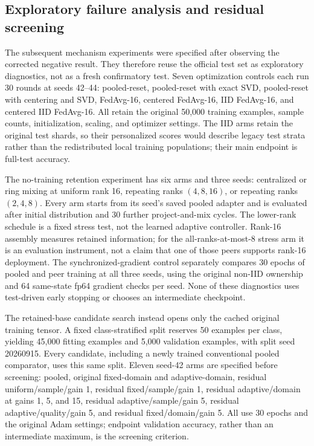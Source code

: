 \documentclass[11pt]{article}
\begin{document}
\subsection{Exploratory failure analysis and residual screening}
The subsequent mechanism experiments were specified after observing the corrected negative result. They therefore reuse the official test set as exploratory diagnostics, not as a fresh confirmatory test. Seven optimization controls each run 30 rounds at seeds 42--44: pooled-reset, pooled-reset with exact SVD, pooled-reset with centering and SVD, FedAvg-16, centered FedAvg-16, IID FedAvg-16, and centered IID FedAvg-16. All retain the original 50,000 training examples, sample counts, initialization, scaling, and optimizer settings. The IID arms retain the original test shards, so their personalized scores would describe legacy test strata rather than the redistributed local training populations; their main endpoint is full-test accuracy.

The no-training retention experiment has six arms and three seeds: centralized or ring mixing at uniform rank 16, repeating ranks $(4,8,16)$, or repeating ranks $(2,4,8)$. Every arm starts from its seed's saved pooled adapter and is evaluated after initial distribution and 30 further project-and-mix cycles. The lower-rank schedule is a fixed stress test, not the learned adaptive controller. Rank-16 assembly measures retained information; for the all-ranks-at-most-8 stress arm it is an evaluation instrument, not a claim that one of those peers supports rank-16 deployment. The synchronized-gradient control separately compares 30 epochs of pooled and peer training at all three seeds, using the original non-IID ownership and 64 same-state fp64 gradient checks per seed. None of these diagnostics uses test-driven early stopping or chooses an intermediate checkpoint.

The retained-base candidate search instead opens only the cached original training tensor. A fixed class-stratified split reserves 50 examples per class, yielding 45,000 fitting examples and 5,000 validation examples, with split seed 20260915. Every candidate, including a newly trained conventional pooled comparator, uses this same split. Eleven seed-42 arms are specified before screening: pooled, original fixed-domain and adaptive-domain, residual uniform/sample/gain 1, residual fixed/sample/gain 1, residual adaptive/domain at gains 1, 5, and 15, residual adaptive/sample/gain 5, residual adaptive/quality/gain 5, and residual fixed/domain/gain 5. All use 30 epochs and the original Adam settings; endpoint validation accuracy, rather than an intermediate maximum, is the screening criterion.
\end{document}
